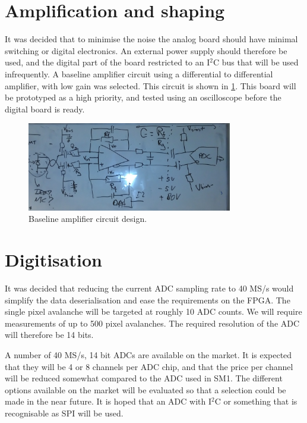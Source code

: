 \documentclass[a4paper]{article}
\begin{document}
\section{Amplification and shaping}

It was decided that to minimise the noise the analog board should have minimal switching or digital electronics.
An external power supply should therefore be used, and the digital part of the board restricted to an I$^2$C bus that will be used infrequently.
A baseline amplifier circuit using a differential to differential amplifier, with low gain was selected.
This circuit is shown in \cref{amplifiercircuit}.
This board will be prototyped as a high priority, and tested using an oscilloscope before the digital board is ready.

\begin{figure}[htp]
    \begin{center}
        \includegraphics[width=0.8\textwidth]{imgs/amplifier}
        \caption{Baseline amplifier circuit design.}
        \label{amplifiercircuit}
    \end{center}
\end{figure}

\section{Digitisation}

It was decided that reducing the current ADC sampling rate to 40 MS/s would simplify the data deserialisation and ease the requirements on the FPGA.
The single pixel avalanche will be targeted at roughly 10 ADC counts.
We will require measurements of up to 500 pixel avalanches.
The required resolution of the ADC will therefore be 14 bits.

A number of 40 MS/s, 14 bit ADCs are available on the market.
It is expected that they will be 4 or 8 channels per ADC chip, and that the price per channel will be reduced somewhat compared to the ADC used in SM1.
The different options available on the market will be evaluated so that a selection could be made in the near future.
It is hoped that an ADC with I$^2$C or something that is recognisable as SPI will be used.
\end{document}
